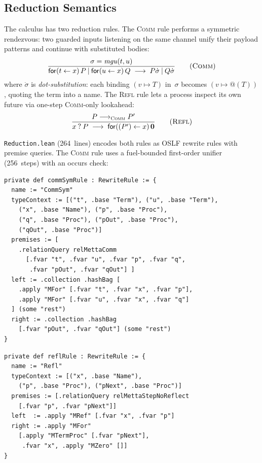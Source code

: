 \documentclass[11pt]{article}
\theoremstyle{definition}
\theoremstyle{remark}
\begin{document}
\subsection{Reduction Semantics}

The calculus has two reduction rules.  The \textsc{Comm} rule performs a
symmetric rendezvous: two guarded inputs listening on the same channel
unify their payload patterns and continue with substituted bodies:
\begin{equation}
  \frac{\sigma = \mathit{mgu}(t, u)}
       {\mathsf{for}(t \leftarrow x)\, P \mathbin{|}
        \mathsf{for}(u \leftarrow x)\, Q
        \;\longrightarrow\;
        P\dot\sigma \mathbin{|} Q\dot\sigma}
  \tag{\textsc{Comm}}
\end{equation}
where $\dot\sigma$ is \emph{dot-substitution}: each binding $(v \mapsto
T)$ in~$\sigma$ becomes $(v \mapsto @(T))$, quoting the term into a
name.  The \textsc{Refl} rule lets a process inspect its own future
via one-step \textsc{Comm}-only lookahead:
\begin{equation}
  \frac{P \longrightarrow_{\textsc{Comm}} P'}
       {x\mathbin{?}P \;\longrightarrow\;
        \mathsf{for}((P') \leftarrow x)\, \mathbf{0}}
  \tag{\textsc{Refl}}
\end{equation}

\texttt{Reduction.lean} (264~lines) encodes both rules as OSLF rewrite
rules with premise queries.  The \textsc{Comm} rule uses a
fuel-bounded first-order unifier (256~steps) with an occurs check:

\begin{lstlisting}[caption={COMM rewrite rule (from \texttt{Syntax.lean})}]
private def commSymRule : RewriteRule := {
  name := "CommSym"
  typeContext := [("t", .base "Term"), ("u", .base "Term"),
    ("x", .base "Name"), ("p", .base "Proc"),
    ("q", .base "Proc"), ("pOut", .base "Proc"),
    ("qOut", .base "Proc")]
  premises := [
    .relationQuery relMettaComm
      [.fvar "t", .fvar "u", .fvar "p", .fvar "q",
       .fvar "pOut", .fvar "qOut"] ]
  left := .collection .hashBag [
    .apply "MFor" [.fvar "t", .fvar "x", .fvar "p"],
    .apply "MFor" [.fvar "u", .fvar "x", .fvar "q"]
  ] (some "rest")
  right := .collection .hashBag
    [.fvar "pOut", .fvar "qOut"] (some "rest")
}
\end{lstlisting}

\begin{lstlisting}[caption={REFL rewrite rule (from \texttt{Syntax.lean})}]
private def reflRule : RewriteRule := {
  name := "Refl"
  typeContext := [("x", .base "Name"),
    ("p", .base "Proc"), ("pNext", .base "Proc")]
  premises := [.relationQuery relMettaStepNoReflect
    [.fvar "p", .fvar "pNext"]]
  left  := .apply "MRef" [.fvar "x", .fvar "p"]
  right := .apply "MFor"
    [.apply "MTermProc" [.fvar "pNext"],
     .fvar "x", .apply "MZero" []]
}
\end{lstlisting}
\end{document}
